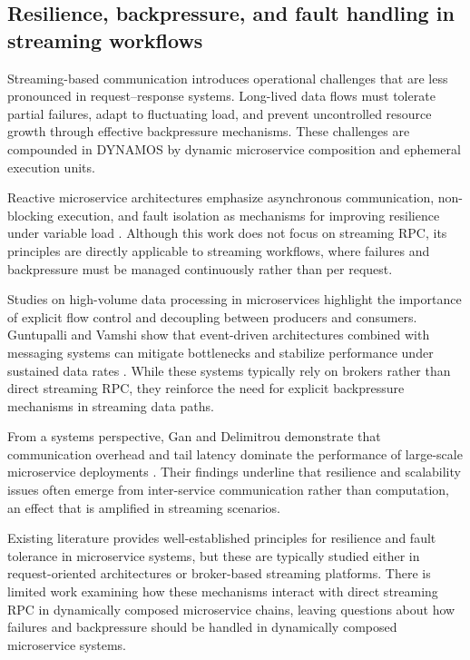 \documentclass[a4paper,10pt,british]{scrartcl}
\begin{document}
\subsection{Resilience, backpressure, and fault handling in streaming workflows}

Streaming-based communication introduces operational challenges that are less pronounced in request--response systems. Long-lived data flows must tolerate partial failures, adapt to fluctuating load, and prevent uncontrolled resource growth through effective backpressure mechanisms. These challenges are compounded in DYNAMOS by dynamic microservice composition and ephemeral execution units.

Reactive microservice architectures emphasize asynchronous communication, non-blocking execution, and fault isolation as mechanisms for improving resilience under variable load \cite{rasheedh2021reactive}. Although this work does not focus on streaming RPC, its principles are directly applicable to streaming workflows, where failures and backpressure must be managed continuously rather than per request.

Studies on high-volume data processing in microservices highlight the importance of explicit flow control and decoupling between producers and consumers. Guntupalli and Vamshi show that event-driven architectures combined with messaging systems can mitigate bottlenecks and stabilize performance under sustained data rates \cite{guntupalli2023highvolume}. While these systems typically rely on brokers rather than direct streaming RPC, they reinforce the need for explicit backpressure mechanisms in streaming data paths.

From a systems perspective, Gan and Delimitrou demonstrate that communication overhead and tail latency dominate the performance of large-scale microservice deployments \cite{gan2018architectural}. Their findings underline that resilience and scalability issues often emerge from inter-service communication rather than computation, an effect that is amplified in streaming scenarios.

Existing literature provides well-established principles for resilience and fault tolerance in microservice systems, but these are typically studied either in request-oriented architectures or broker-based streaming platforms. There is limited work examining how these mechanisms interact with direct streaming RPC in dynamically composed microservice chains, leaving questions about how failures and backpressure should be handled in dynamically composed microservice systems.
\end{document}
